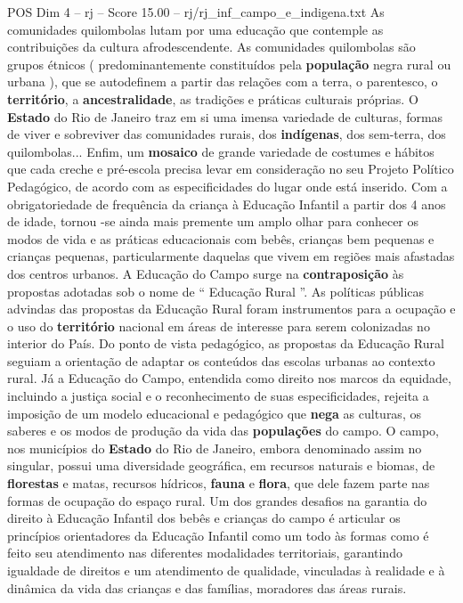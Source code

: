 \begin{textsample}{POS Dim 4 – rj – Score 15.00 – rj/rj\_inf\_campo\_e\_indigena.txt}
As comunidades quilombolas lutam por uma educação que contemple as contribuições da cultura afrodescendente.
As comunidades quilombolas são grupos étnicos ( predominantemente constituídos pela \textbf{população} negra rural ou urbana ), que se autodefinem a partir das relações com a terra, o parentesco, o \textbf{território}, a \textbf{ancestralidade}, as tradições e práticas culturais próprias.
O \textbf{Estado} do Rio de Janeiro traz em si uma imensa variedade de culturas, formas de viver e sobreviver das comunidades rurais, dos \textbf{indígenas}, dos sem-terra, dos quilombolas...
Enfim, um \textbf{mosaico} de grande variedade de costumes e hábitos que cada creche e pré-escola precisa levar em consideração no seu Projeto Político Pedagógico, de acordo com as especificidades do lugar onde está inserido.
Com a obrigatoriedade de frequência da criança à Educação Infantil a partir dos 4 anos de idade, tornou -se ainda mais premente um amplo olhar para conhecer os modos de vida e as práticas educacionais com bebês, crianças bem pequenas e crianças pequenas, particularmente daquelas que vivem em regiões mais afastadas dos centros urbanos.
A Educação do Campo surge na \textbf{contraposição} às propostas adotadas sob o nome de “ Educação Rural ”.
As políticas públicas advindas das propostas da Educação Rural foram instrumentos para a ocupação e o uso do \textbf{território} nacional em áreas de interesse para serem colonizadas no interior do País.
Do ponto de vista pedagógico, as propostas da Educação Rural seguiam a orientação de adaptar os conteúdos das escolas urbanas ao contexto rural.
Já a Educação do Campo, entendida como direito nos marcos da equidade, incluindo a justiça social e o reconhecimento de suas especificidades, rejeita a imposição de um modelo educacional e pedagógico que \textbf{nega} as culturas, os saberes e os modos de produção da vida das \textbf{populações} do campo.
O campo, nos municípios do \textbf{Estado} do Rio de Janeiro, embora denominado assim no singular, possui uma diversidade geográfica, em recursos naturais e biomas, de \textbf{florestas} e matas, recursos hídricos, \textbf{fauna} e \textbf{flora}, que dele fazem parte nas formas de ocupação do espaço rural.
Um dos grandes desafios na garantia do direito à Educação Infantil dos bebês e crianças do campo é articular os princípios orientadores da Educação Infantil como um todo às formas como é feito seu atendimento nas diferentes modalidades territoriais, garantindo igualdade de direitos e um atendimento de qualidade, vinculadas à realidade e à dinâmica da vida das crianças e das famílias, moradores das áreas rurais.

\end{textsample}
